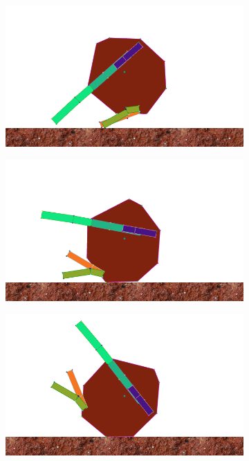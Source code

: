       \begin{figure}[H]
        \centering

        \begin{subfigure}[b]{0.3\textwidth}
          \includegraphics[width=\linewidth,center]{graphics/simulation-discussion/roll_1}
          \caption{\label{fig:roll_1}}
        \end{subfigure}
        \hspace{\fill}
        \begin{subfigure}[b]{0.3\textwidth}
          \includegraphics[width=\linewidth,center]{graphics/simulation-discussion/roll_2}
          \caption{\label{fig:roll_2}}
        \end{subfigure}
        \hspace{\fill}
        \begin{subfigure}[b]{0.3\textwidth}
          \includegraphics[width=\linewidth,center]{graphics/simulation-discussion/roll_3}

\end{subfigure}
\end{figure}
